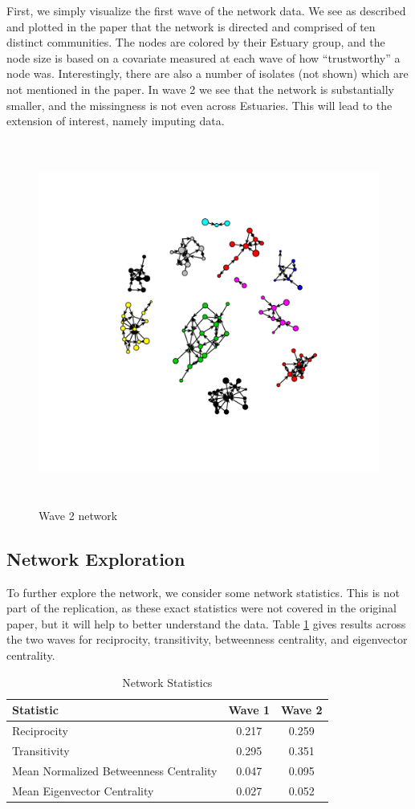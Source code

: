 \documentclass[12pt]{article} %
\numberwithin{equation}{section}		%
\numberwithin{figure}{section}			%
\numberwithin{table}{section}				%
\begin{document}
First, we simply visualize the first wave of the network data. We see as described and plotted in the paper that the network is directed and comprised of ten distinct communities. The nodes are colored by their Estuary group, and the node size is based on a covariate measured at each wave of how ``trustworthy'' a node was. Interestingly, there are also a number of isolates (not shown) which are not mentioned in the paper. In wave 2 we see that the network is substantially smaller, and the missingness is not even across Estuaries. This will lead to the extension of interest, namely imputing data.

\begin{figure}[!ht]
      \includegraphics[width=16cm, height = 12cm]{wave2plot.pdf}
      \caption{Wave 2 network}\label{fig:x2}
\end{figure}

\subsection{Network Exploration}
To further explore the network, we consider some network statistics. This is not part of the replication, as these exact statistics were not covered in the original paper, but it will help to better understand the data. Table \ref{tab07} gives results across the two waves for reciprocity, transitivity, betweenness centrality, and eigenvector centrality.

\begin{table}[!ht]
 	   \caption{\label{tab07} Network Statistics}
 	\centering
 	\begin{tabular}{lcc}
 		\hline
 		Statistic & Wave 1 & Wave 2 \\ 	
 		\hline
 		Reciprocity & 0.217 & 0.259 \\
 		Transitivity & 0.295 & 0.351 \\
 		Mean Normalized Betweenness Centrality & 0.047 & 0.095 \\
 		Mean Eigenvector Centrality & 0.027 & 0.052 \\
 		\hline
 	\end{tabular}
\end{table}
\end{document}
